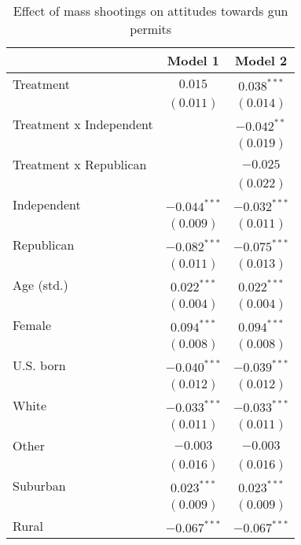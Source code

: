 
\begin{table}
\caption{Effect of mass shootings on attitudes towards gun permits}
\begin{center}
\begin{tabular}{l c c}
\toprule
 & Model 1 & Model 2 \\
\midrule
Treatment               & $0.015$        & $0.038^{***}$  \\
                        & $(0.011)$      & $(0.014)$      \\
Treatment x Independent &                & $-0.042^{**}$  \\
                        &                & $(0.019)$      \\
Treatment x Republican  &                & $-0.025$       \\
                        &                & $(0.022)$      \\
Independent             & $-0.044^{***}$ & $-0.032^{***}$ \\
                        & $(0.009)$      & $(0.011)$      \\
Republican              & $-0.082^{***}$ & $-0.075^{***}$ \\
                        & $(0.011)$      & $(0.013)$      \\
Age (std.)              & $0.022^{***}$  & $0.022^{***}$  \\
                        & $(0.004)$      & $(0.004)$      \\
Female                  & $0.094^{***}$  & $0.094^{***}$  \\
                        & $(0.008)$      & $(0.008)$      \\
U.S. born               & $-0.040^{***}$ & $-0.039^{***}$ \\
                        & $(0.012)$      & $(0.012)$      \\
White                   & $-0.033^{***}$ & $-0.033^{***}$ \\
                        & $(0.011)$      & $(0.011)$      \\
Other                   & $-0.003$       & $-0.003$       \\
                        & $(0.016)$      & $(0.016)$      \\
Suburban                & $0.023^{***}$  & $0.023^{***}$  \\
                        & $(0.009)$      & $(0.009)$      \\
Rural                   & $-0.067^{***}$ & $-0.067^{***}$ \\

\end{tabular}
\end{center}
\end{table}
